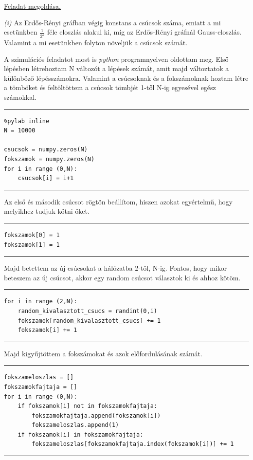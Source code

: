\documentclass[a4paper, 12pt]{article}
\numberwithin{equation}{section}          %
\numberwithin{figure}{subsection}
\begin{document}
\clearpage
\begin{center}
	\underline{Feladat megoldása.}
\end{center}
\hspace{5cm}


\textit{(i)}\newline
Az Erdős-Rényi gráfban végig konstans a csúcsok száma, emiatt a mi esetünkben $\frac{1}{2^k}$ féle eloszlás alakul ki, míg az Erdős-Rényi gráfnál Gauss-eloszlás.\\
Valamint a mi esetünkben folyton növeljük a csúcsok számát.

A szimulációs feladatot most is \textit{python} programnyelven oldottam meg. Első lépésben létrehoztam N változót a lépések számát, amit majd változtatok a különböző lépésszámokra. Valamint a csúcsoknak és a fokszámoknak hoztam létre a tömböket és feltöltöttem a csúcsok tömbjét 1-től N-ig egyesével egész számokkal.
\newline
\rule{\textwidth}{0.1pt}
\begin{lstlisting}
%pylab inline
N = 10000

csucsok = numpy.zeros(N)
fokszamok = numpy.zeros(N)
for i in range (0,N):
	csucsok[i] = i+1
\end{lstlisting}
\rule{\textwidth}{0.1pt}

Az első és második csúcsot rögtön beállítom, hiszen azokat egyértelmű, hogy melyikhez tudjuk kötni őket.
\newline
\rule{\textwidth}{0.1pt}
\begin{lstlisting}
fokszamok[0] = 1
fokszamok[1] = 1
\end{lstlisting}
\rule{\textwidth}{0.1pt}

Majd betettem az új csúcsokat a hálózatba 2-től, N-ig. Fontos, hogy mikor beteszem az új csúcsot, akkor egy random csúcsot választok ki és ahhoz kötöm.
\newline
\rule{\textwidth}{0.1pt}
\begin{lstlisting}
for i in range (2,N):
	random_kivalasztott_csucs = randint(0,i)
	fokszamok[random_kivalasztott_csucs] += 1
	fokszamok[i] += 1
\end{lstlisting}
\rule{\textwidth}{0.1pt}

\clearpage
Majd kigyűjtöttem a fokszámokat és azok előfordulásának számát.\newline
\rule{\textwidth}{0.1pt}
\begin{lstlisting}
fokszameloszlas = []
fokszamokfajtaja = []
for i in range (0,N):
	if fokszamok[i] not in fokszamokfajtaja:
		fokszamokfajtaja.append(fokszamok[i])
		fokszameloszlas.append(1)
	if fokszamok[i] in fokszamokfajtaja:
		fokszameloszlas[fokszamokfajtaja.index(fokszamok[i])] += 1
\end{lstlisting}
\rule{\textwidth}{0.1pt}
\end{document}
